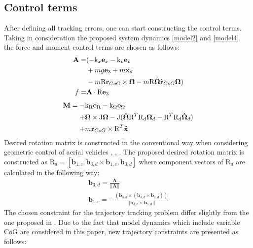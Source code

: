 \subsection{Control terms}
After defining all tracking errors, one can start constructing the control terms. Taking in consideration the proposed system dynamics \eqref{model2} and \eqref{model4}, the force and moment control terms are chosen as follows:
\begin{align}
	\begin{split}
		\textbf{A} =& (- \text{k}_x \textbf{e}_x - \text{k}_v \textbf{e}_v \\
		& + mg\textbf{e}_3 + m\ddot{\textbf{x}}_d \\
		& - m\text{R}\textbf{r}_{CoG}  \times \dot{\boldsymbol{\Omega}} - m\text{R}\hat{\boldsymbol{\Omega}}\hat{\textbf{r}}_{CoG}\boldsymbol{\Omega} ) \\
		f =& \textbf{A} \cdot \text{R}\textbf{e}_3 \label{force_control}
	\end{split}
\end{align}
\begin{align}
	\begin{split}
		\textbf{M} = -& \text{k}_\text{R} \textbf{e}_\text{R} - \text{k}_\Omega \textbf{e}_\Omega \\
			+& \boldsymbol{\Omega} \times \text{J}\boldsymbol{\Omega} - \text{J}(\hat{\boldsymbol{\Omega}}\text{R}^T\text{R}_d\boldsymbol{\Omega}_d - \text{R}^T\text{R}_d\dot{\boldsymbol{\Omega}}_d) \\
			+& m\textbf{r}_{CoG} \times \text{R}^T \ddot{\textbf{x}}  \label{moment_control}
	\end{split}
\end{align}
\indent Desired rotation matrix is constructed in the conventional way when considering geometric control of aerial vehicles \cite{LeeClanak4}, \cite{LeeClanak3}, \cite{LeeClanak2}. The proposed desired rotation matrix is constructed as $\text{R}_d = [\textbf{b}_{1,c}, \textbf{b}_{3,d} \times \textbf{b}_{1,c}, \textbf{b}_{3,d}]$ where component vectors of $\text{R}_d$ are calculated in the following way:
\begin{gather}
	\textbf{b}_{3,d} = \frac{\textbf{A}}{|| \textbf{A} ||} \\
	\textbf{b}_{1,c} = -\frac{(\textbf{b}_{3,d} \times (\textbf{b}_{3,d} \times \textbf{b}_{1,d}))}{||\textbf{b}_{3,d} \times \textbf{b}_{1,d}||}
\end{gather}
The chosen constraint for the trajectory tracking problem differ slightly from the one proposed in \cite{LeeClanak4}. Due to the fact that model dynamics which include variable CoG are considered in this paper, new trajectory constraints are presented as follows:
